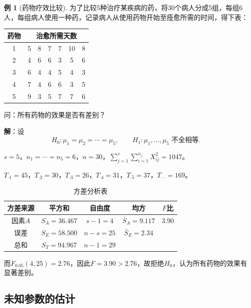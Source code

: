 \documentclass[11pt,a4paper]{report}
\theoremstyle{definition}
\newtheorem{example}{例}[chapter]
\begin{document}
\begin{example}[药物疗效比较]
为了比较5种治疗某疾病的药，将30个病人分成5组，每组6人，每组病人使用一种药，记录病人从使用药物开始至痊愈所需的时间，得下表：

\begin{table}[htbp]
\centering
\begin{tabular}{@{}ccccccc@{}}
\toprule
药物 & \multicolumn{6}{c}{治愈所需天数} \\
\midrule
1 & 5 & 8 & 7 & 7 & 10 & 8 \\
2 & 4 & 6 & 6 & 3 & 5 & 6 \\
3 & 6 & 4 & 4 & 5 & 4 & 3 \\
4 & 7 & 4 & 6 & 6 & 3 & 5 \\
5 & 9 & 3 & 5 & 7 & 7 & 6 \\
\bottomrule
\end{tabular}
\end{table}

问：所有药物的效果是否有差别？

\textbf{解}：设
\[
H_{0}\colon\mu_{1}=\mu_{2}=\cdots=\mu_{5},\qquad H_{1}\colon\mu_{1},\ldots,\mu_{5}\text{ 不全相等}.
\]

$s=5$，$n_{1}=\cdots=n_{5}=6$，$n=30$，$\displaystyle\sum_{j=1}^{s}\sum_{i=1}^{n_{j}}X_{ij}^{2}=1047$。

$T_{\cdot 1}=45$，$T_{\cdot 2}=30$，$T_{\cdot 3}=26$，$T_{\cdot 4}=31$，$T_{\cdot 5}=37$，$T_{\cdot\cdot}=169$。

\begin{table}[htbp]
\centering
\caption{方差分析表}
\begin{tabular}{@{}ccccc@{}}
\toprule
方差来源 & 平方和 & 自由度 & 均方 & $F$比 \\
\midrule
因素$A$ & $S_{A}=36.467$ & $s-1=4$ & $\bar{S}_{A}=9.117$ & $3.90$ \\
误差 & $S_{E}=58.500$ & $n-s=25$ & $\bar{S}_{E}=2.34$ & \\
总和 & $S_{T}=94.967$ & $n-1=29$ & & \\
\bottomrule
\end{tabular}
\end{table}

而$F_{0.05}(4,25)=2.76$，因此$F=3.90>2.76$，故拒绝$H_{0}$，认为所有药物的效果有显著差别。
\end{example}

\subsection{未知参数的估计}
\end{document}

